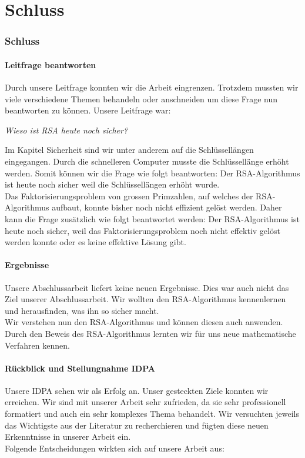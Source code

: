 \part{Schluss}
\section{Schluss}
\subsection{Leitfrage beantworten}
Durch unsere Leitfrage konnten wir die Arbeit eingrenzen. Trotzdem mussten wir viele verschiedene Themen behandeln oder anschneiden um diese Frage nun beantworten zu können. Unsere Leitfrage war:
\begin{center}\textit{Wieso ist RSA heute noch sicher?}\end{center}
Im Kapitel Sicherheit sind wir unter anderem auf die Schlüssellängen eingegangen. Durch die schnelleren Computer musste die Schlüssellänge erhöht werden. Somit können wir die Frage wie folgt beantworten: Der RSA-Algorithmus ist heute noch sicher weil die Schlüssellängen erhöht wurde.\\
Das Faktorisierungsproblem von grossen Primzahlen, auf welches der RSA-Algorithmus aufbaut, konnte bisher noch nicht effizient gelöst werden. Daher kann die Frage zusätzlich wie folgt beantwortet werden: Der RSA-Algorithmus ist heute noch sicher, weil das Faktorisierungsproblem noch nicht effektiv gelöst werden konnte oder es keine effektive Lösung gibt.
%
\subsection{Ergebnisse}
Unsere Abschlussarbeit liefert keine neuen Ergebnisse. Dies war auch nicht das Ziel unserer Abschlussarbeit. Wir wollten den RSA-Algorithmus kennenlernen und herausfinden, was ihn so sicher macht.\\
Wir verstehen nun den RSA-Algorithmus und können diesen auch anwenden. Durch den Beweis des RSA-Algorithmus lernten wir für uns neue mathematische Verfahren kennen.\\
%
\subsection{Rückblick und Stellungnahme IDPA}
Unsere IDPA sehen wir als Erfolg an. Unser gesteckten Ziele konnten wir erreichen. Wir sind mit unserer Arbeit sehr zufrieden, da sie sehr professionell formatiert und auch ein sehr komplexes Thema behandelt. Wir versuchten jeweils das Wichtigste aus der Literatur zu recherchieren und fügten diese neuen Erkenntnisse in unserer Arbeit ein. \\
Folgende Entscheidungen wirkten sich auf unsere Arbeit aus:
